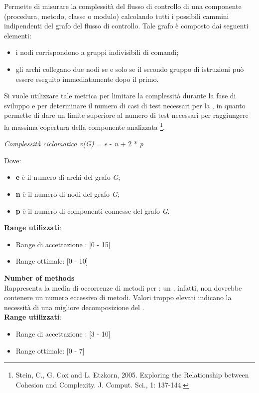 Permette di misurare la complessità del flusso di controllo di una componente (procedura, metodo, classe o modulo) calcolando tutti i possibili cammini indipendenti del grafo del flusso di controllo. Tale grafo è composto dai seguenti elementi:
\begin{itemize}
	\item i nodi corrispondono a gruppi indivisibili di comandi;
	\item gli archi collegano due nodi se e solo se il secondo gruppo di istruzioni può essere eseguito immediatamente dopo il primo.
\end{itemize}
Si vuole utilizzare tale metrica per limitare la complessità durante la fase di sviluppo e per determinare il numero di casi di test necessari per la , in quanto permette di dare un limite superiore al numero di test necessari per raggiungere la massima copertura della componente analizzata \footnote{Stein, C., G. Cox and L. Etzkorn, 2005. Exploring the Relationship between Cohesion and Complexity. J. Comput. Sci., 1: 137-144.}.
\begin{center}
	\textit{Complessità ciclomatica v(G)} = \textit{e} - \textit{n} + 2 * \textit{p}
\end{center}
Dove:
\begin{itemize}
	\item \textbf{e} è il numero di archi del grafo \textit{G};
	\item \textbf{n} è il numero di nodi del grafo \textit{G};
	\item \textbf{p} è il numero di componenti connesse del grafo \textit{G}.
\end{itemize}
\textbf{Range utilizzati}:
\begin{itemize}
	\item Range di accettazione : [0 - 15]
	\item Range ottimale: [0 - 10]
\end{itemize}

\textbf{Number of methods}\\

Rappresenta la media di occorrenze di metodi per : un , infatti, non dovrebbe contenere un numero eccessivo di metodi. Valori troppo elevati indicano la necessità di una migliore decomposizione del . \\

\textbf{Range utilizzati}:
\begin{itemize}
	\item Range di accettazione : [3 - 10]
	\item Range ottimale: [0 - 7]
\end{itemize}


